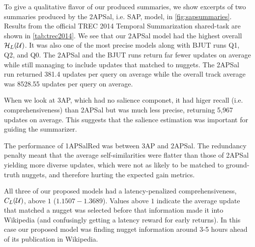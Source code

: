 

To give a qualitative flavor of our produced summaries,
we show excerpts of two summaries produced by the 2APSal, i.e. SAP, model,
in \autoref{fig:sapsummaries}.
Results from the official TREC 2014 Temporal Summarization shared-task 
are shown in \autoref{tab:trec2014}. We see that our 2APSal
model had the highest overall $\mathcal{H}_L(\mathcal{U})$. It was also one of the 
most precise models along with BJUT runs Q1, Q2, and Q0. The 2APSal and 
the BJUT runs return far fewer updates on average while still managing to 
include updates that matched to nuggets. The 2APSal run returned 
381.4 updates per query on average while the overall track average was 8528.55
updates per query on average. 

When we look at 3AP, which had no salience
componet, it had higer recall (i.e. comprehensiveness) than 2APSal 
but was much less 
precise, returning 5,967 updates on average. This suggests that the salience
estimation was important for guiding the summarizer. 

The performance of 1APSalRed was between 3AP and 2APSal. The redundancy
penalty meant that the average self-similarities were flatter than 
those of 2APSal
yielding more diverse updates, which were not as likely to be matched
to ground-truth nuggets, and therefore hurting the expected gain metrics.


All three of our proposed models had a latency-penalized comprehensiveness, $C_L(\mathcal{U})$,
above $1$ ($1.1507 - 1.3689$). Values above $1$ indicate the average update that matched a nugget
was selected before that information made it into Wikipedia (and confusingly
getting a latency reward for early returns). In this case 
our proposed model was finding nugget information around 3-5 hours ahead of
its publication in Wikipedia.  


